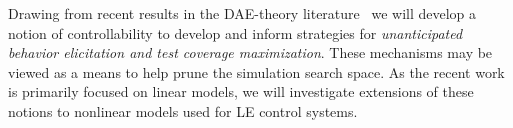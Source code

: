 % 
Drawing from recent results in the DAE-theory literature~\cite{Berger2013ControllabilitySurvey,Ilchmann2005ATheory,BergerOnSystems,Lamour2013} we will develop a notion of controllability to develop and inform strategies for \emph{unanticipated behavior elicitation and test coverage maximization}. These mechanisms may be viewed as a means to help prune the simulation search space. %
As the recent work is primarily focused on linear models, we will investigate extensions of these notions to nonlinear models used for LE control systems.  


